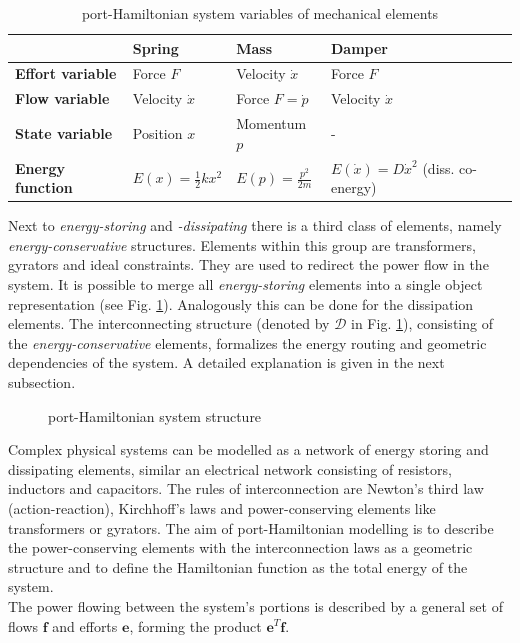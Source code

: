 \documentclass[a4paper,twoside, openright,12pt]{report}
\newcommand{\f}[1]{\boldsymbol{#1}}
\begin{document}
\begin{table}
	\centering
	\caption[port-Hamiltonian system variables of mechanical elements]{port-Hamiltonian system variables of mechanical elements}\vspace{10pt}
	\label{TAB:PHSvar_mechanic}
	
	\begin{tabular}{ l | l | l | l }
		& \textbf{Spring} & \textbf{Mass} & \textbf{Damper} \\ \hline
		\textbf{Effort variable} & Force $F$ & Velocity $\dot{x}$ & Force $ F $ \\ \hline
		\textbf{Flow variable} & Velocity $ \dot{x} $ & Force $ F = \dot{p} $ & Velocity $ \dot{x} $ \\ \hline
		\textbf{State variable} & Position $x$ & Momentum $ p $ & - \\ \hline
		\textbf{Energy function} & $ E(x) = \frac{1}{2}kx^2 $ & $ E(p) = \frac{p^2}{2m} $ & $E(\dot{x}) = D\dot{x}^2  $ (diss. co-energy) \\ 
	\end{tabular}
\end{table}

Next to \emph{energy-storing} and \emph{-dissipating} there is a third class of elements, namely \emph{energy-conservative} structures. Elements within this group are transformers, gyrators and ideal constraints. They are used to redirect the power flow in the system. It is possible to merge all \emph{energy-storing} elements into a single object representation (see Fig. \ref{FIG:pHsstructure}). Analogously this can be done for the dissipation elements. The interconnecting structure (denoted by $\mathcal{D}$ in Fig. \ref{FIG:pHsstructure}), consisting of the \emph{energy-conservative} elements, formalizes the energy routing and geometric dependencies of the system. A detailed explanation is given in the next subsection.


\begin{figure}[b!]
	\centering
	\small
	\def\svgwidth{0.6\columnwidth}
	
	\caption{port-Hamiltonian system structure}
	\label{FIG:pHsstructure}
\end{figure}

Complex physical systems can be modelled as a network of energy storing and dissipating elements, similar an electrical network consisting of resistors, inductors and capacitors. The rules of interconnection are Newton's third law (action-reaction), Kirchhoff's laws and power-conserving elements like transformers or gyrators. The aim of port-Hamiltonian modelling is to describe the power-conserving elements with the interconnection laws as a geometric structure and to define the Hamiltonian function as the total energy of the system. \\
The power flowing between the system's portions is described by a general set of flows $\f{f}$ and efforts $\f{e}$, forming the product $\f{e}^T\f{f}$.
\end{document}
